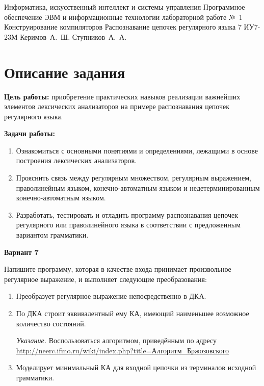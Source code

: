 \documentclass{bmstu-gost-7-32}
\begin{document}
\makereporttitle
	{Информатика, искусственный интеллект и системы управления} %
	{Программное обеспечение ЭВМ и информационные технологии} %
	{лабораторной работе №~1} %
	{Конструирование компиляторов} %
	{Распознавание цепочек регулярного языка} %
	{7} %
	{ИУ7-23М} %
	{Керимов~А.~Ш.} %
	{Ступников~А.~А.} %

\section*{Описание задания}

\textbf{Цель работы:} приобретение практических навыков реализации важнейших элементов лексических анализаторов на примере распознавания цепочек регулярного языка.

\textbf{Задачи работы:}
\begin{enumerate}
	\item Ознакомиться с основными понятиями и определениями, лежащими в основе построения лексических анализаторов.
	\item Прояснить связь между регулярным множеством, регулярным выражением, праволинейным языком, конечно-автоматным языком и недетерминированным конечно-автоматным языком.
	\item Разработать, тестировать и отладить программу распознавания цепочек регулярного или праволинейного языка в соответствии с предложенным вариантом грамматики.
\end{enumerate}

\textbf{Вариант 7}

Напишите программу, которая в качестве входа принимает произвольное регулярное выражение, и выполняет следующие преобразования:

\begin{enumerate}
	\item Преобразует регулярное выражение непосредственно в ДКА.
	\item По ДКА строит эквивалентный ему КА, имеющий наименьшее возможное количество состояний.

	\textit{Указание.} Воспользоваться алгоритмом, приведённым по адресу \href{http://neerc.ifmo.ru/wiki/index.php?title=%
		\%D0\%90\%D0\%BB\%D0\%B3\%D0\%BE\%D1\%80\%D0\%B8\%D1\%82\%D0\%BC_%
		\%D0\%91\%D1\%80\%D0\%B6\%D0\%BE\%D0\%B7\%D0\%BE\%D0\%B2\%D1\%81\%D0\%BA\%D0\%BE\%D0\%B3\%D0\%BE}%
	{http://neerc.ifmo.ru/wiki/index.php?title=Алгоритм\_Бржозовского}

	\item Моделирует минимальный КА для входной цепочки из терминалов исходной грамматики.
\end{enumerate}
\end{document}
